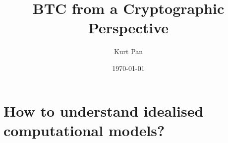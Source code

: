 \documentclass[11pt]{article}
\begin{document}
\title{BTC from a Cryptographic Perspective}
\author{Kurt Pan}
\date{\today}
\maketitle
\tableofcontents

\section{How to understand idealised computational models?}




\end{document}
